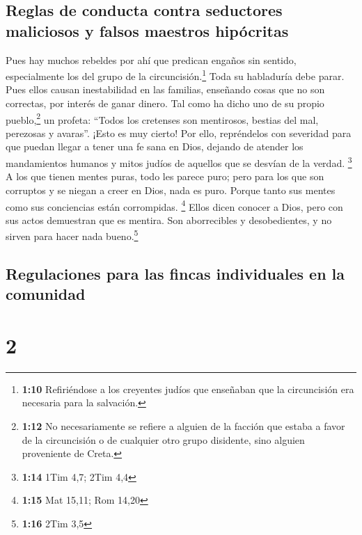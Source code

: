\hypertarget{reglas-de-conducta-contra-seductores-maliciosos-y-falsos-maestros-hipuxf3critas}{%
\subsection{Reglas de conducta contra seductores maliciosos y falsos
maestros
hipócritas}\label{reglas-de-conducta-contra-seductores-maliciosos-y-falsos-maestros-hipuxf3critas}}

 Pues hay muchos rebeldes por ahí que predican engaños
sin sentido, especialmente los del grupo de la circuncisión.\footnote{\textbf{1:10}
  Refiriéndose a los creyentes judíos que enseñaban que la circuncisión
  era necesaria para la salvación.}  Toda su habladuría
debe parar. Pues ellos causan inestabilidad en las familias, enseñando
cosas que no son correctas, por interés de ganar dinero. 
Tal como ha dicho uno de su propio pueblo,\footnote{\textbf{1:12} No
  necesariamente se refiere a alguien de la facción que estaba a favor
  de la circuncisión o de cualquier otro grupo disidente, sino alguien
  proveniente de Creta.} un profeta: ``Todos los cretenses son
mentirosos, bestias del mal, perezosas y avaras''.  ¡Esto
es muy cierto! Por ello, repréndelos con severidad para que puedan
llegar a tener una fe sana en Dios,  dejando de atender
los mandamientos humanos y mitos judíos de aquellos que se desvían de la
verdad. \footnote{\textbf{1:14} 1Tim 4,7; 2Tim 4,4}  A
los que tienen mentes puras, todo les parece puro; pero para los que son
corruptos y se niegan a creer en Dios, nada es puro. Porque tanto sus
mentes como sus conciencias están corrompidas. \footnote{\textbf{1:15}
  Mat 15,11; Rom 14,20}  Ellos dicen conocer a Dios, pero
con sus actos demuestran que es mentira. Son aborrecibles y
desobedientes, y no sirven para hacer nada bueno.\footnote{\textbf{1:16}
  2Tim 3,5}

\hypertarget{regulaciones-para-las-fincas-individuales-en-la-comunidad}{%
\subsection{Regulaciones para las fincas individuales en la
comunidad}\label{regulaciones-para-las-fincas-individuales-en-la-comunidad}}

\hypertarget{section-1}{%
\section{2}\label{section-1}}

